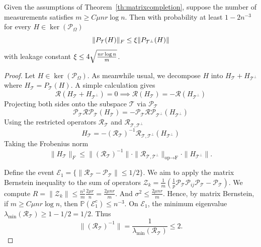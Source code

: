 \begin{lemma}\label{le:leakagecompletion}
Given the assumptions of Theorem~\ref{th:matrixcompletion}, 
suppose the number of measurements satisfies $m \ge C \mu n r \log n$.  Then with probability at least $1 - 2n^{-3}$ for every $H \in \ker(\mathcal{P}_\Omega)$ 
$$\|P_{\mathcal{T}}(H)\|_F \le \xi \|P_{\mathcal{T}^\perp}(H)\|$$
with leakage constant $\xi \le 4 \sqrt{\frac{nr \log n}{m}}$.
\end{lemma}

\begin{proof}
Let $H \in \ker(\mathcal{P}_\Omega)$. As meanwhile usual, we decompose $H$ into $H_{\mathcal{T}} + H_{\mathcal{T}^\perp}$ where $H_{\mathcal{T}} = P_{\mathcal{T}}(H)$.
A simple calculation gives 
$$\mathcal{R}(H_{\mathcal{T}} + H_{\mathcal{T}^\perp}) = 0 \implies \mathcal{R}(H_{\mathcal{T}}) = -\mathcal{R}(H_{\mathcal{T}^\perp})$$
Projecting both sides onto the subspace $\mathcal{T}$ via $\mathcal{P}_{\mathcal{T}}$
$$\mathcal{P}_{\mathcal{T}} \mathcal{R} \mathcal{P}_{\mathcal{T}}(H_{\mathcal{T}}) = -\mathcal{P}_{\mathcal{T}} \mathcal{R} \mathcal{P}_{\mathcal{T}^\perp}(H_{\mathcal{T}^\perp})$$
Using the restricted operators $\mathcal{R}_{\mathcal{T}}$ and $\mathcal{R}_{\mathcal{T}, \mathcal{T}^\perp}$
$$H_{\mathcal{T}} = -(\mathcal{R}_{\mathcal{T}})^{-1} \mathcal{R}_{\mathcal{T}, \mathcal{T}^\perp} (H_{\mathcal{T}^\perp})$$
Taking the Frobenius norm
\fi
\begin{equation}\label{eq:Hbound1}
\|H_{\mathcal{T}}\|_F \le \|(\mathcal{R}_{\mathcal{T}})^{-1}\| \cdot \|\mathcal{R}_{\mathcal{T}, \mathcal{T}^\perp}\|_{\text{op} \to \text{F}} \cdot \|H_{\mathcal{T}^\perp}\|.
\end{equation}

Define the event $\mathcal{E}_1 = \{ \|\mathcal{R}_{\mathcal{T}} - \mathcal{P}_{\mathcal{T}}\| \le 1/2 \}$.
We aim to apply the matrix Bernstein inequality to the sum of operators $\mathcal{Z}_k = \frac{1}{m} (\frac{1}{p} \mathcal{P}_{\mathcal{T}} \mathcal{P}_{ij} \mathcal{P}_{\mathcal{T}} - \mathcal{P}_{\mathcal{T}})$. We compute
$R = \|\mathcal{Z}_k\| \le \frac{n^2}{m} \frac{2\mu r}{n} = \frac{2\mu n r}{m}$. And $\sigma^2 \le \frac{2\mu n r}{m}$. Hence, by matrix Bernstein, if $m \ge C \mu n r \log n$, then $\mathbb{P}(\mathcal{E}_1^c) \le n^{-3}$.
On $\mathcal{E}_1$, the minimum eigenvalue $\lambda_{\min}(\mathcal{R}_{\mathcal{T}}) \ge 1 - 1/2 = 1/2$. Thus
$$\|(\mathcal{R}_{\mathcal{T}})^{-1}\| = \frac{1}{\lambda_{\min}(\mathcal{R}_{\mathcal{T}})} \le 2.$$


\end{proof}
